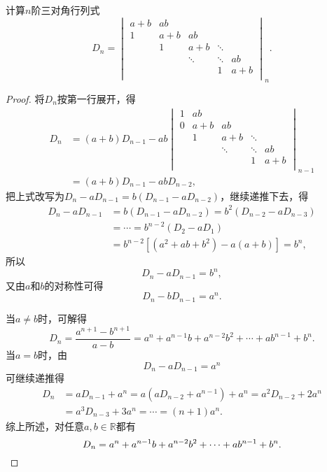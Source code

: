 \begin{example}
计算\(n\)阶三对角行列式\[
	D_n = \begin{vmatrix}
		a+b & ab & \\
		1 & a+b & ab & \\
		& 1 & a + b & \ddots & \\
		& & \ddots & \ddots & ab \\
		& & & 1 & a+b \\
	\end{vmatrix}_n.
\]
\begin{proof}
将\(D_n\)按第一行展开，得\begin{align*}
D_n &= (a+b) D_{n-1} - ab \begin{vmatrix}
1 & ab \\
0 & a+b & ab \\
 & 1 & a+b & \ddots \\
 & & \ddots & \ddots & ab \\
 & & & 1 & a+b \\
\end{vmatrix}_{n-1} \\
&= (a+b) D_{n-1} - ab D_{n-2},
\end{align*}
把上式改写为\(D_n - a D_{n-1} = b(D_{n-1} - a D_{n-2})\)，继续递推下去，得\begin{align*}
D_n - a D_{n-1} &= b(D_{n-1} - a D_{n-2}) = b^2(D_{n-2} - a D_{n-3}) \\
&= \dotsb = b^{n-2}(D_2 - a D_1) \\
&= b^{n-2} [(a^2 + ab + b^2) - a(a+b)] = b^n,
\end{align*}所以\[
D_n - a D_{n-1} = b^n,
\]又由\(a\)和\(b\)的对称性可得\[
D_n - b D_{n-1} = a^n.
\]

当\(a \neq b\)时，可解得\[
D_n = \frac{a^{n+1} - b^{n+1}}{a - b}
= a^n + a^{n-1} b + a^{n-2} b^2 + \dotsb + a b^{n-1} + b^n.
\]当\(a = b\)时，由\[
D_n - a D_{n-1} = a^n
\]可继续递推得\begin{align*}
D_n &= a D_{n-1} + a^n
= a(a D_{n-2} + a^{n-1}) + a^n
= a^2 D_{n-2} + 2 a^n \\
&= a^3 D_{n-3} + 3 a^n
= \dotsb
= (n+1) a^n.
\end{align*}
综上所述，对任意\(a,b\in\mathbb{R}\)都有\[
D_n = a^n + a^{n-1} b + a^{n-2} b^2 + \dotsb + a b^{n-1} + b^n.
\qedhere
\]
\end{proof}
\end{example}

